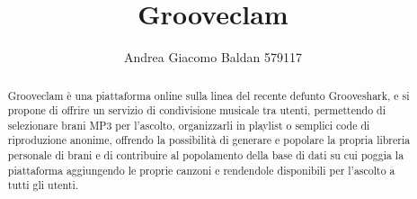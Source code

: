 \documentclass[11pt,a4paper]{article}
\title{Grooveclam}
\author{Andrea Giacomo Baldan 579117}
\begin{document}
\maketitle
\begin{abstract}
Grooveclam è una piattaforma online sulla linea del recente defunto Grooveshark, e si propone di
offrire un servizio di condivisione musicale tra utenti, permettendo di selezionare
brani MP3 per l'ascolto, organizzarli in playlist o semplici code
di riproduzione anonime, offrendo la possibilità di generare e popolare la
propria libreria personale di brani e di contribuire al
popolamento della base di dati su cui poggia la piattaforma aggiungendo le proprie canzoni
e rendendole disponibili per l'ascolto a tutti gli utenti.
\end{abstract}
\end{document}
